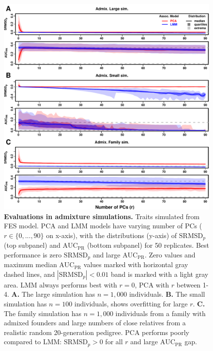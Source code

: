 \documentclass[11pt]{article}
\newcommand{\rmsd}{\text{SRMSD}_p}
\newcommand{\auc}{\text{AUC}_\text{PR}}
\begin{document}
\begin{figure}[bp!]
  \centering
  \includegraphics[width=\textwidth,height=\textheight,keepaspectratio]{fes/rmsd-auc-sim.pdf}
  \caption{
    {\small 
      {\bf Evaluations in admixture simulations.}
      Traits simulated from FES model.
      PCA and LMM models have varying number of PCs ($r \in \{0, ..., 90\}$ on x-axis), with the distributions (y-axis) of $\rmsd$ (top subpanel) and $\auc$ (bottom subpanel) for 50 replicates.
      Best performance is zero $\rmsd$ and large $\auc$.
      Zero values and maximum median $\auc$ values marked with horizontal gray dashed lines, and $|\rmsd| < 0.01$ band is marked with a light gray area.
      LMM always performs best with $r=0$, PCA with $r$ between 1-4.
      \textbf{A.}
      The large simulation has $n = 1,000$ individuals.
      \textbf{B.}
      The small simulation has $n = 100$ individuals, shows overfitting for large $r$.
      \textbf{C.}
      The family simulation has $n = 1,000$ individuals from a family with admixed founders and large numbers of close relatives from a realistic random 20-generation pedigree.
      PCA performs poorly compared to LMM: $\rmsd > 0$ for all $r$ and large $\auc$ gap.
    }
  }
  \label{fig:rmsd-auc-sim}
\end{figure}
\end{document}
